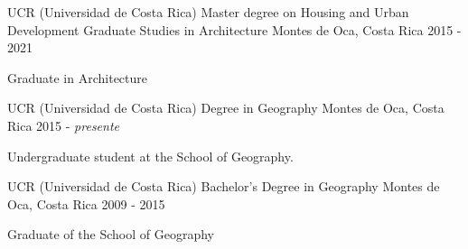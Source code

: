 

\begin{cventries}
  \cventry
  {UCR (Universidad de Costa Rica)} %
  {Master degree on Housing and Urban Development Graduate Studies in Architecture} %
  {Montes de Oca, Costa Rica} %
  {2015 - 2021} %
  {
    \begin{cvitems} %
      \item {Graduate in Architecture}
    \end{cvitems}
  }

  \cventry
  {UCR (Universidad de Costa Rica)} %
  {Degree in Geography} %
  {Montes de Oca, Costa Rica} %
  {2015 - \textit{presente}} %
  {
    \begin{cvitems} %
      \item {Undergraduate student at the School of Geography.}
    \end{cvitems}
  }

  \cventry
  {UCR (Universidad de Costa Rica)} %
  {Bachelor's Degree in Geography} %
    {Montes de Oca, Costa Rica} %
    {2009 - 2015} %
    {
      \begin{cvitems} %
        \item {Graduate of the School of Geography}
      \end{cvitems}
    }

\end{cventries}
